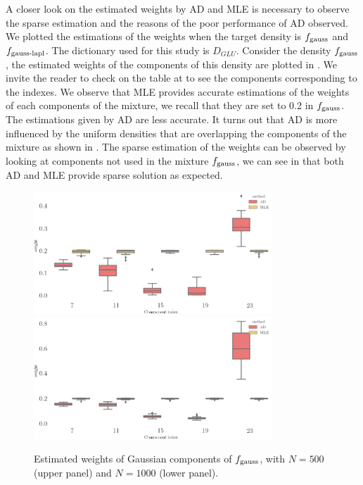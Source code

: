 A closer look on the estimated weights by AD and MLE is necessary to observe the sparse estimation and the reasons of the poor performance of AD observed. We plotted the estimations of the weights when the target density is
$f_{\textnormal{gauss}}$ and $f_{\textnormal{gauss-lapl}}$. The dictionary used for this study is $D_{GLU}$. Consider the density $f_{\textnormal{gauss}}$, the estimated weights of the components of this density are plotted in . We invite the reader to check on the table at  to see the components corresponding to the indexes. We observe that MLE provides accurate estimations of the weights of each components of the mixture, we recall that they are set to 0.2 in $f_{\textnormal{gauss}}$. The estimations given by AD are less accurate. It turns out that AD is more influenced by the uniform densities that are overlapping the components of the mixture as shown in . The sparse estimation of the weights can be observed by looking at components not used in the mixture $f_{\textnormal{gauss}}$, we can see in  that both AD and MLE provide sparse solution as expected. 
\begin{figure}
\center
    \includegraphics[width=0.8\textwidth]{./TeX_files/weight_f_gauss_real_comp_N_500.png}
    \includegraphics[width=0.8\textwidth]{./TeX_files/weight_f_gauss_real_comp_N_1000.png}
    \caption{Estimated weights of Gaussian components of $f_{\textnormal{gauss}}$, with $N=500$ (upper panel) and $N=1000$
    (lower panel).}
    \label{fig:weights_gauss_real_indexes}
\end{figure}
